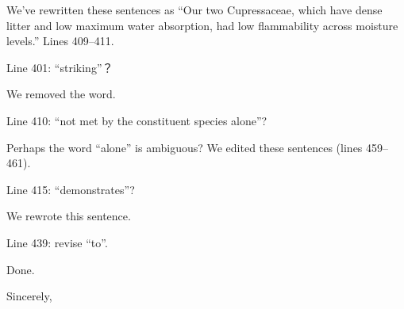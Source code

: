 \documentclass[letterpaper, 12pt]{letter}
\begin{document}
\begin{letter}{}
We've rewritten these sentences as ``Our two Cupressaceae, which have dense
litter and low maximum water absorption, had low flammability across moisture
levels.'' Lines 409--411.

\begin{quoting}
  Line 401: “striking”？
\end{quoting}

We removed the word.

\begin{quoting}
  Line 410: “not met by the constituent species alone”?
\end{quoting}

Perhaps the word ``alone'' is ambiguous? We edited these sentences (lines 459--461).

\begin{quoting}
  Line 415: “demonstrates”?
\end{quoting}

We rewrote this sentence.

\begin{quoting}
  Line 439: revise “to”.
\end{quoting}

Done.

\closing{Sincerely,}

\end{letter}
\end{document}
